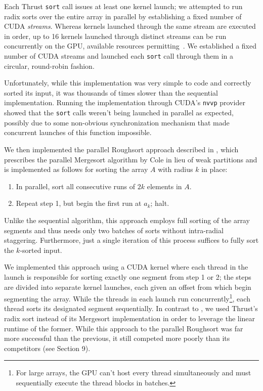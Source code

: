 \documentclass[letterpaper, 12pt]{article}
\let\supercite\cite
\renewcommand{\cite}[1]{\textnormal{~\supercite{#1}}}
\begin{document}
Each Thrust \texttt{sort} call issues at least one kernel launch; we attempted to run radix sorts over the entire array in
  parallel by establishing a fixed number of CUDA \textit{streams}.
Whereas kernels launched through the same stream are executed in order, up to 16 kernels launched through distinct streams can be
  run concurrently on the GPU, available resources permitting\cite{cuda}.
We established a fixed number of CUDA streams and launched each \texttt{sort} call through them in a circular, round-robin
  fashion.

Unfortunately, while this implementation was very simple to code and correctly sorted its input, it was thousands of times
  slower than the sequential implementation.
Running the implementation through CUDA's \texttt{nvvp} provider showed that the \texttt{sort} calls weren't being launched in
  parallel as expected, possibly due to some non-obvious synchronization mechanism that made concurrent launches of this
  function impossible.

We then implemented the parallel Roughsort approach described in \supercite{altman90}, which prescribes the parallel Mergesort
  algorithm by Cole in lieu of weak partitions and is implemented as follows for sorting the array $A$ with radius $k$ in place:
\begin{enumerate}\setlength{\itemsep}{0pt}\setlength{\parskip}{0pt}
\item In parallel, sort all consecutive runs of $2k$ elements in $A$.
\item Repeat step 1, but begin the first run at $a_k$; halt.
\end{enumerate}

Unlike the sequential algorithm, this approach employs full sorting of the array segments and thus needs only two batches of
  sorts without intra-radial staggering.
Furthermore, just a single iteration of this process suffices to fully sort the $k$-sorted input.

We implemented this approach using a CUDA kernel where each thread in the launch is responsible for sorting exactly one segment
  from step 1 or 2; the steps are divided into separate kernel launches, each given an offset from which begin segmenting the
  array.
While the threads in each launch run concurrently\footnote{For large arrays, the GPU can't host every thread simultaneously and
  must sequentially execute the thread blocks in batches.}, each thread sorts its designated segment sequentially.
In contrast to \supercite{altman90}, we used Thrust's radix sort instead of its Mergesort implementation in order to leverage
  the linear runtime of the former.
While this approach to the parallel Roughsort was far more successful than the previous, it still competed more poorly than
  its competitors (see Section 9).
\end{document}
